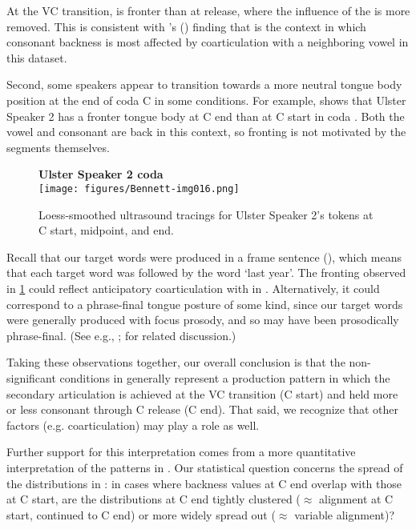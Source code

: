 \documentclass[output=paper,colorlinks,citecolor=brown]{langscibook}
\newcommand{\vel}{\ipa{ˠ}}
\begin{document}
At the VC transition,  is fronter than at  release, where the influence of the  is more removed. This is consistent with \citeauthor{Bennett_etal2023_jphon_submission}'s (\citeyear{Bennett_etal2023_jphon_submission}) finding that  is the context in which consonant backness is most affected by coarticulation with a neighboring vowel in this dataset. 

Second, some speakers appear to transition towards a more neutral tongue body position at the end of coda C in some conditions. For example,  shows that Ulster Speaker 2 has a fronter tongue body at C end than at C start in coda . Both the vowel and consonant are back in this context, so fronting is not motivated by the segments themselves.

\begin{figure}
    \centering
    \textbf{Ulster Speaker 2 coda }\\
    \texttt{[image: figures/Bennett-img016.png]}
    \caption{Loess-smoothed ultrasound tracings for Ulster Speaker 2's  tokens at C start, midpoint, and end.}
    \label{fig:isp}
\end{figure}

Recall that our target words were produced in a frame sentence (), which means that each target word was followed by the word \ipa{[əˈn\vel ʊr\vel ə]} `last year'. The fronting observed in \ref{fig:isp} could reflect anticipatory coarticulation with \ipa{[ə]} in \ipa{[əˈn\vel ʊr\vel ə]}. Alternatively, it could correspond to a phrase-final tongue posture of some kind, since our target words were generally produced with focus prosody, and so may have been prosodically phrase-final. (See e.g., \cite{Gick_etal2004_rest_position}; \cite{Katsika2016_boundary_lengthening} for related discussion.)

Taking these observations together, our overall conclusion is that the non-significant conditions in  generally represent a production pattern in which the secondary articulation is achieved at the VC transition (C start) and held more or less consonant through C release (C end). That said, we recognize that other factors (e.g. coarticulation) may play a role as well.

Further support for this interpretation comes from a more quantitative interpretation of the patterns in . Our statistical question concerns the spread of the distributions in : in cases where backness values at C end overlap with those at C start, are the distributions at C end tightly clustered ($\approx$ alignment at C start, continued to C end) or more widely spread out ($\approx$ variable alignment)?
\end{document}
